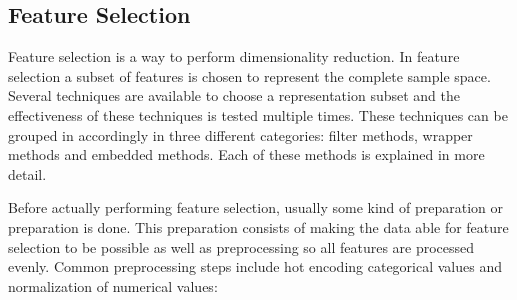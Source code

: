 	\subsection{Feature Selection}
	\label{subsec:FeatureSelection}
	
	Feature selection is a way to perform dimensionality reduction. In feature selection a subset of features is chosen to represent the complete sample space\cite{Guyon2006}. Several techniques are available to choose a representation subset and the effectiveness of these techniques is tested multiple times\cite{CATAL20091040, molina2002feature, chandrashekar2014survey}. These techniques can be grouped in accordingly in three different categories: filter methods, wrapper methods and embedded methods\cite{saeys2007review}. Each of these methods is explained in more detail.
	
	Before actually performing feature selection, usually some kind of preparation or preparation is done. This preparation consists of making the data able for feature selection to be possible as well as preprocessing so all features are processed evenly. Common preprocessing steps include hot encoding categorical values and normalization of numerical values:
	
